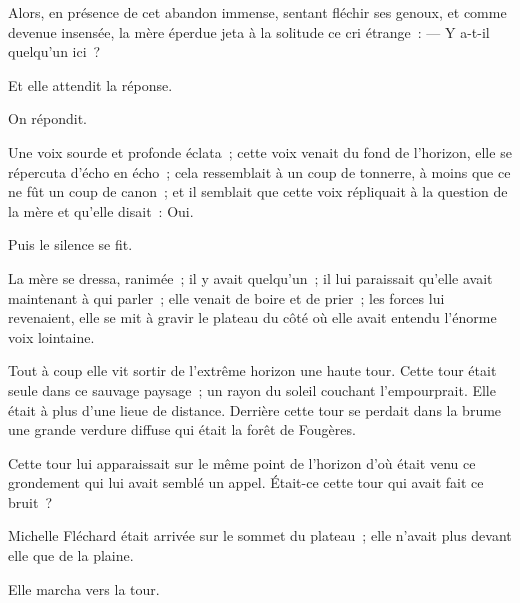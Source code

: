 \documentclass[french,twoside]{book} %
\begin{document}
Alors, en présence de cet abandon immense, sentant fléchir ses genoux, et comme devenue insensée, la mère éperdue jeta à la solitude ce cri étrange : — Y a-t-il quelqu’un ici ?\par
 Et elle attendit la réponse.\par
On répondit.\par
Une voix sourde et profonde éclata ; cette voix venait du fond de l’horizon, elle se répercuta d’écho en écho ; cela ressemblait à un coup de tonnerre, à moins que ce ne fût un coup de canon ; et il semblait que cette voix répliquait à la question de la mère et qu’elle disait : Oui.\par
Puis le silence se fit.\par
La mère se dressa, ranimée ; il y avait quelqu’un ; il lui paraissait qu’elle avait maintenant à qui parler ; elle venait de boire et de prier ; les forces lui revenaient, elle se mit à gravir le plateau du côté où elle avait entendu l’énorme voix lointaine.\par
Tout à coup elle vit sortir de l’extrême horizon une haute tour. Cette tour était seule dans ce sauvage paysage ; un rayon du soleil couchant l’empourprait. Elle était à plus d’une lieue de distance. Derrière cette tour se perdait dans la brume une grande verdure diffuse qui était la forêt de Fougères.\par
Cette tour lui apparaissait sur le même point de l’horizon d’où était venu ce grondement qui lui avait semblé un appel. Était-ce cette tour qui avait fait ce bruit ?\par
Michelle Fléchard était arrivée sur le sommet du plateau ; elle n’avait plus devant elle que de la plaine.\par
Elle marcha vers la tour.
\end{document}
